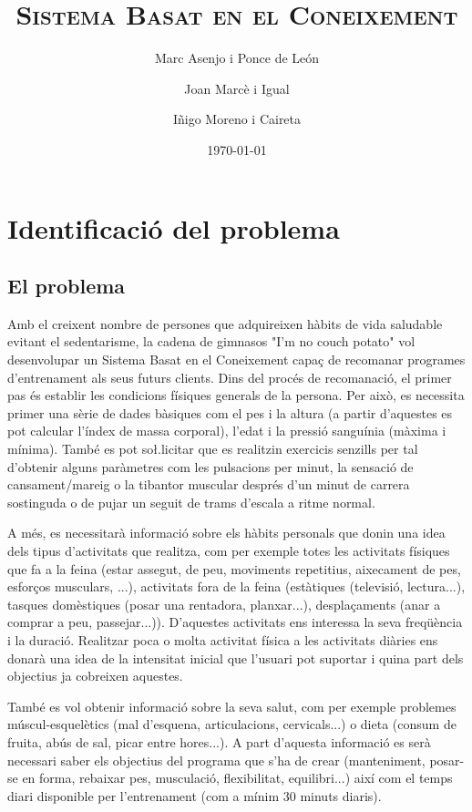 \documentclass[a4paper, 12pt]{article}
\begin{document}
\title{\textsc{Sistema Basat en el Coneixement}}
\author{Marc Asenjo i Ponce de León \and
	Joan Marcè i Igual \and
	Iñigo Moreno i Caireta}
\date{\today}
\maketitle

\section{Identificació del problema}

\subsection{El problema}

Amb el creixent nombre de persones que adquireixen hàbits de vida saludable evitant el sedentarisme, la cadena de gimnasos "I'm no couch potato" vol desenvolupar un Sistema Basat en el Coneixement capaç de recomanar programes d'entrenament als seus futurs clients. Dins del procés de recomanació, el primer pas és establir les condicions físiques generals de la persona. Per això, es necessita primer una sèrie de dades bàsiques com el pes i la altura (a partir d'aquestes es pot calcular l'índex de massa corporal), l'edat i la pressió sanguínia (màxima i mínima). També es pot so\l.licitar que es realitzin exercicis senzills per tal d'obtenir alguns paràmetres com les pulsacions per minut, la sensació de cansament/mareig o la tibantor muscular després d'un minut de carrera sostinguda o de pujar un seguit de trams d'escala a ritme normal. 

A més, es necessitarà informació sobre els hàbits personals que donin una idea dels tipus d'activitats que realitza, com per exemple totes les activitats físiques que fa a la feina (estar assegut, de peu, moviments repetitius, aixecament de pes, esforços musculars, ...), activitats fora de la feina (estàtiques (televisió, lectura...), tasques domèstiques (posar una rentadora, planxar...), desplaçaments (anar a comprar a peu, passejar...)). D'aquestes activitats ens interessa la seva freqüència i la duració. Realitzar poca o molta activitat física a les activitats diàries ens donarà una idea de la intensitat inicial que l'usuari pot suportar i quina part dels objectius ja cobreixen aquestes. 

També es vol obtenir informació sobre la seva salut, com per exemple problemes múscul-esquelètics (mal d'esquena, articulacions, cervicals...) o dieta (consum de fruita, abús de sal, picar entre hores...). 
A part d'aquesta informació es serà necessari saber els objectius del programa que s'ha de crear (manteniment, posar-se en forma, rebaixar pes, musculació, flexibilitat, equilibri...) així com el temps diari disponible per l'entrenament (com a mínim 30 minuts diaris).
 
\end{document}
